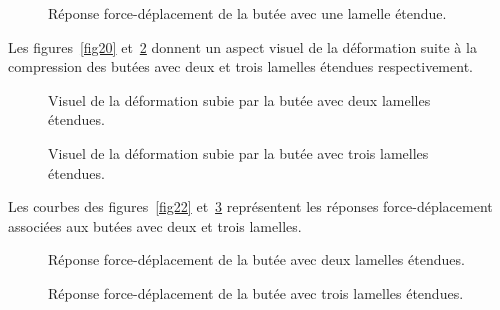 ﻿\documentclass{article}
\begin{document}
\begin{figure}[!h]
	\centering
	\caption{Réponse force-déplacement de la butée avec une lamelle étendue.}
	\label{fig19}
\end{figure}

Les figures~\ref{fig20} et~\ref{fig21} donnent un aspect visuel de la déformation suite à la compression des butées avec deux et trois lamelles étendues respectivement.

\begin{figure}[htbp]
	\begin{minipage}[c]{.45\linewidth}
	\begin{center}
	\caption{Visuel de la déformation subie par la butée avec deux lamelles étendues.}
	\label{fig20}
	\end{center}
	\end{minipage}
	\hfill
	\begin{minipage}[c]{.45\linewidth}
	\begin{center}
	\caption{Visuel de la déformation subie par la butée avec trois lamelles étendues.}
	\label{fig21}
	\end{center}
	\end{minipage}
\end{figure}

Les courbes des figures~\ref{fig22} et~\ref{fig23} représentent les réponses force-déplacement associées aux butées avec deux et trois lamelles.

\begin{figure}[htbp]
	\begin{minipage}[c]{.45\linewidth}
	\begin{center}
	\caption{Réponse force-déplacement de la butée avec deux lamelles étendues.}
	\label{fig22}
	\end{center}
	\end{minipage}
	\hfill
	\begin{minipage}[c]{.45\linewidth}
	\begin{center}
	\caption{Réponse force-déplacement de la butée avec trois lamelles étendues.}
	\label{fig23}
	\end{center}
	\end{minipage}
\end{figure}
\end{document}
